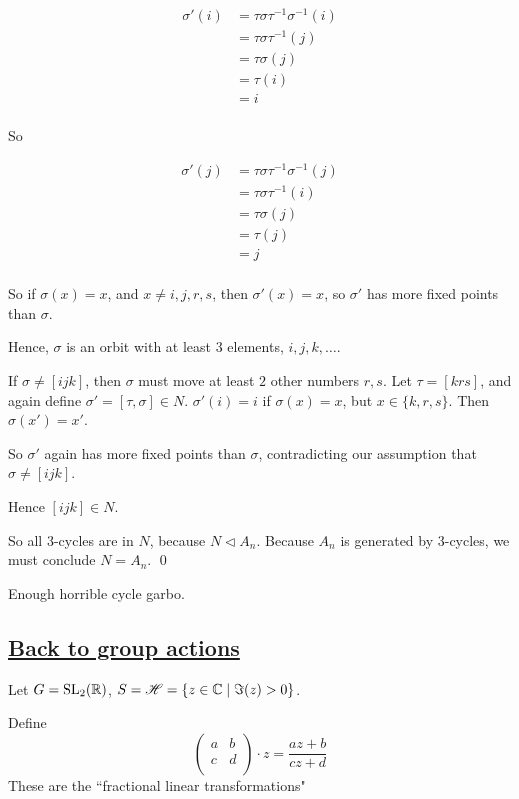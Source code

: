 \documentclass[x11names,reqno,14pt]{extarticle}
\begin{document}
\begin{align*}
\sigma'(i) & = \tau\sigma\tau^{-1}\sigma^{-1}(i) \\
			  & = \tau\sigma\tau^{-1}(j) \\
			  & = \tau\sigma(j) \\
			  & = \tau(i) \\
			  & = i \\
\end{align*}

So

\begin{align*}
\sigma'(j) & = \tau\sigma\tau^{-1}\sigma^{-1}(j) \\
			  & = \tau\sigma\tau^{-1}(i) \\
			  & = \tau\sigma(j) \\
	        & = \tau(j) \\
			  & = j \\
\end{align*}

So if $\sigma(x) = x$, and $x \neq i, j, r, s$, then $\sigma'(x) = x$, so $\sigma'$ has more fixed points than $\sigma$. 

Hence, $\sigma$ is an orbit with at least $3$ elements, $i, j, k, \dots$. 

If $\sigma \neq [ijk]$, then $\sigma$ must move at least $2$ other numbers $r, s$. Let $\tau = [krs]$, and again define $\sigma' = [\tau, \sigma] \in N$. $\sigma'(i) = i$ if $\sigma(x) = x$, but $x \in \{k,r,s\}$. Then $\sigma(x') = x'$. 

So $\sigma'$ again has more fixed points than $\sigma$, contradicting our assumption that $\sigma \neq [ijk]$. 

Hence $[ijk] \in N$. 

So all $3$-cycles are in $N$, because $N \lhd A_n$. Because $A_n$ is generated by 3-cycles, we must conclude $N = A_n$. 
\qed

Enough horrible cycle garbo. 

\subsection*{\underline{Back to group actions}}

\exm

Let $G = {\mathrm{SL}}_2(\mathbb{R})$, $S = \mathscr{H} = \{z \in \mathbb{C} \mid \Im(z) > 0 \}$.

Define 
\[
\begin{pmatrix} a & b \\ c & d \\ \end{pmatrix} \cdot z = \frac{az + b}{cz + d}
\] 
These are the ``fractional linear transformations"
\end{document}
